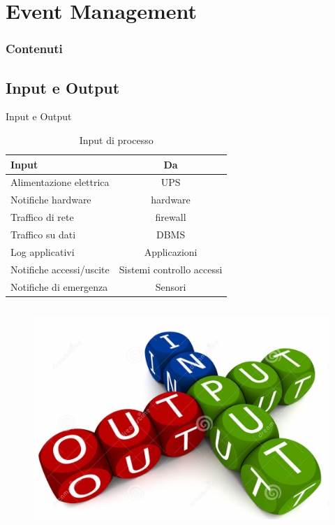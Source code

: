 %
\section{Event Management}
\frame
{
\frametitle{Contenuti}
\tableofcontents[currentsection]
\addtocounter{framenumber}{-1}
}

\subsection*{Input e Output}
\begin{frame}{Input e Output}
\begin{table}
\begin{tabular}{ l | c }
\textbf{Input} & \textbf{Da}\\
\hline
Alimentazione elettrica & UPS\\
Notifiche hardware & hardware\\
Traffico di rete & firewall\\
Traffico su dati & DBMS\\
Log applicativi & Applicazioni\\
Notifiche accessi/uscite & Sistemi controllo accessi\\
Notifiche di emergenza & Sensori\\
\end{tabular}
\caption{Input di processo}
\end{table}
\begin{columns}
\begin{column}{0.3\textwidth}
\begin{figure}
\vspace{-15mm}
\includegraphics[scale=0.1]{Images/Input_output.png}

\end{figure}
\end{column}
\end{columns}
\end{frame}
